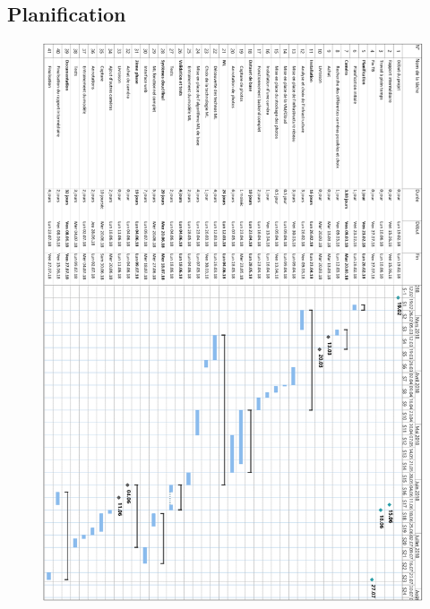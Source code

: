 \begin{appendix}
\chapter{Planification}
\begin{figure}[H]
    \includegraphics[width=14cm]{img/planif.png}
    \centering
\end{figure} 


\end{appendix}
